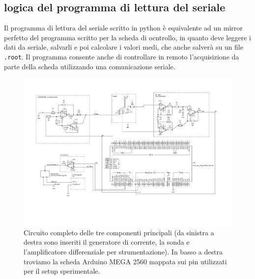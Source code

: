 \documentclass[fleqn,varvw,preprintnumbers,citeautoscript]{memo}
\begin{document}
\subsection{logica del programma di lettura del seriale}

Il programma di lettura del seriale scritto in python è equivalente ad un mirror perfetto del programma scritto per la scheda di ocntrollo, in quanto deve leggere i dati da seriale, salvarli e poi calcolare i valori medi, che anche salverà su un file \verb-.root-. Il programma consente anche di controllare in remoto l'acquisizione da parte della scheda utilizzando una comunicazione seriale. 

%


\begin{turnpage}
    \begin{figure}[p]
        \centering
        \includegraphics[width=\linewidth,trim={1.5cm 3.5cm 2cm 2cm},clip]{SCHEMA_full1.pdf}
        \caption{Circuito completo delle tre componenti principali (da sinistra a destra sono inseriti il generatore di corrente, la sonda e l'amplificatore differenziale per strumentazione). In basso a destra troviamo la scheda Arduino MEGA 2560 mappata sui pin utilizzati per il setup sperimentale. }\label{fig:circuit_memo2}
    \end{figure}
\end{turnpage}
\end{document}
